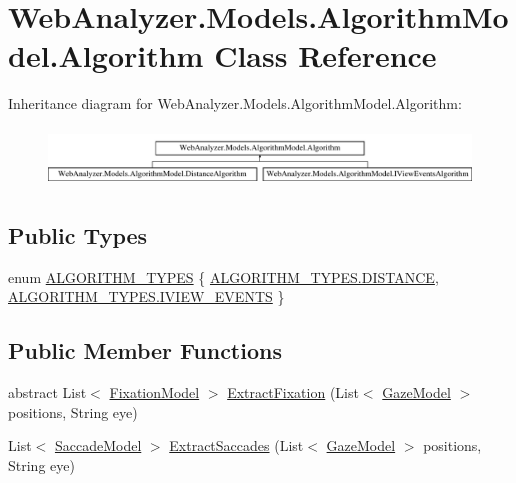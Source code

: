 \hypertarget{class_web_analyzer_1_1_models_1_1_algorithm_model_1_1_algorithm}{}\section{Web\+Analyzer.\+Models.\+Algorithm\+Model.\+Algorithm Class Reference}
\label{class_web_analyzer_1_1_models_1_1_algorithm_model_1_1_algorithm}
Inheritance diagram for Web\+Analyzer.\+Models.\+Algorithm\+Model.\+Algorithm\+:\begin{figure}[H]
\begin{center}
\leavevmode
\includegraphics[height=1.559888cm]{class_web_analyzer_1_1_models_1_1_algorithm_model_1_1_algorithm}
\end{center}
\end{figure}
\subsection*{Public Types}
\begin{DoxyCompactItemize}
\item 
enum \hyperlink{class_web_analyzer_1_1_models_1_1_algorithm_model_1_1_algorithm_a170e7786e033cbd0c09cabb30030794b}{A\+L\+G\+O\+R\+I\+T\+H\+M\+\_\+\+T\+Y\+P\+E\+S} \{ \hyperlink{class_web_analyzer_1_1_models_1_1_algorithm_model_1_1_algorithm_a170e7786e033cbd0c09cabb30030794bab06c2037eb7a58030a42212c8244d477}{A\+L\+G\+O\+R\+I\+T\+H\+M\+\_\+\+T\+Y\+P\+E\+S.\+D\+I\+S\+T\+A\+N\+C\+E}, 
\hyperlink{class_web_analyzer_1_1_models_1_1_algorithm_model_1_1_algorithm_a170e7786e033cbd0c09cabb30030794bac26c9f91b65d50d7c790272029d7dd49}{A\+L\+G\+O\+R\+I\+T\+H\+M\+\_\+\+T\+Y\+P\+E\+S.\+I\+V\+I\+E\+W\+\_\+\+E\+V\+E\+N\+T\+S}
 \}
\end{DoxyCompactItemize}
\subsection*{Public Member Functions}
\begin{DoxyCompactItemize}
\item 
abstract List$<$ \hyperlink{class_web_analyzer_1_1_models_1_1_analysis_model_1_1_fixation_model}{Fixation\+Model} $>$ \hyperlink{class_web_analyzer_1_1_models_1_1_algorithm_model_1_1_algorithm_aed9ae492d1851815f79d9b2f3361711e}{Extract\+Fixation} (List$<$ \hyperlink{class_web_analyzer_1_1_models_1_1_data_model_1_1_gaze_model}{Gaze\+Model} $>$ positions, String eye)
\item 
List$<$ \hyperlink{class_web_analyzer_1_1_models_1_1_analysis_model_1_1_saccade_model}{Saccade\+Model} $>$ \hyperlink{class_web_analyzer_1_1_models_1_1_algorithm_model_1_1_algorithm_ac6607203b63241b68e2e4180c97de9a0}{Extract\+Saccades} (List$<$ \hyperlink{class_web_analyzer_1_1_models_1_1_data_model_1_1_gaze_model}{Gaze\+Model} $>$ positions, String eye)
\end{DoxyCompactItemize}


